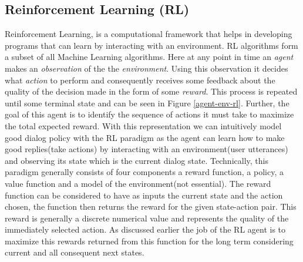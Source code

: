 \documentclass[14pt]{extarticle}
\numberwithin{equation}{section}
\begin{document}
	\subsection{Reinforcement Learning (RL)}
	Reinforcement Learning, is a computational framework that helps in developing programs that can learn by interacting with an environment. RL algorithms form a subset of all Machine Learning algorithms. Here at any point in time an \textit{agent} makes an \textit{observation} of the the \textit{environment}. Using this observation it decides what \textit{action} to perform and consequently receives some feedback about the quality of the decision made in the form of some \textit{reward}. This process is repeated until some terminal state and can be seen in Figure \ref{agent-env-rl}. Further, the goal of this agent is to identify the sequence of actions it must take to maximize the total expected reward. With this representation we can intuitively model good dialog policy with the RL paradigm as the agent can learn how to make good replies(take actions) by interacting with an environment(user utterances) and observing its state which is the current dialog state. Technically, this paradigm generally consists of four components a reward function, a policy, a value function and a model of the environment(not essential). The reward function can be considered to have as inputs the current state and the action chosen, the function then returns the reward for the given state-action pair. This reward is generally a discrete numerical value and represents the quality of the immediately selected action. As discussed earlier the job of the RL agent is to maximize this rewards returned from this function for the long term considering current and all consequent next states.
	
\end{document}
